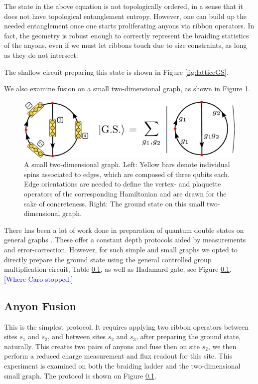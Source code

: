 \documentclass[two column]{article}
\newcommand{\jovan}[1]{\textcolor{blue}{[#1]}}
\begin{document}
The state in the above equation is not topologically ordered, in a sense that it does not have topological entanglement entropy.
However, one can build up the needed entanglement once one starts proliferating anyons via ribbon operators.
In fact, the geometry is robust enough to correctly represent the braiding statistics of the anyons, even if we must let ribbons touch due to size constraints, as long as they do not intersect.

The shallow circuit preparing this state is shown in Figure \ref{fig:latticeGS}.

We also examine fusion on a small two-dimensional graph, as shown in Figure \ref{fig:basketball}.

\begin{figure}
    \centering
    \includegraphics[width=\linewidth]{Figures/basketball.pdf}
    \caption{A small two-dimensional graph. Left: Yellow bars denote individual spins associated to edges, which are composed of three qubits each. Edge orientations are needed to define the vertex- and plaquette operators of the corresponding Hamiltonian and are drawn for the sake of concreteness. Right: The ground state on this small two-dimensional graph.}
    \label{fig:basketball}
\end{figure}


There has been a lot of work done in preparation of quantum double states on general graphs \cite{}.
These offer a constant depth protocols aided by measurements and error-correction.
However, for such simple and small graphs we opted to directly prepare the ground state using the general controlled group multiplication circuit, Table \ref{}, as well as Hadamard gate, see Figure \ref{}. \jovan{Where Caro stopped.}

\subsection{Anyon Fusion}

This is the simplest protocol.
It requires applying two ribbon operators between sites $s_1$ and $s_2$, and between sites $s_2$ and $s_3$, after preparing the ground state, naturally.
This creates two pairs of anyons and fuse then on site $s_2$, we then perform a reduced charge measurement and flux readout for this site.
This experiment is examined on both the braiding ladder and the two-dimensional small graph.
The protocol is shown on Figure \ref{}.
\end{document}
